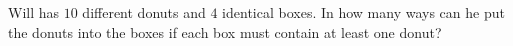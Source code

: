 Will has $10$ different donuts and $4$ identical boxes. In how many ways can he put the donuts into the boxes if each box must contain at least one donut?
